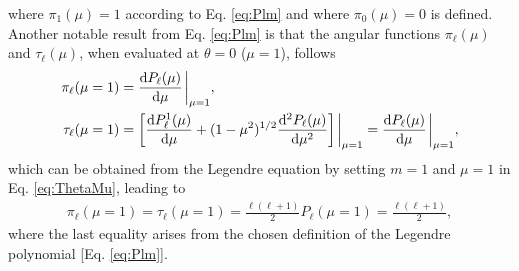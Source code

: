 %
where $\pi_1(\mu) = 1$ according to  Eq. \eqref{eq:Plm} and where $\pi_0(\mu)=0$ is defined. Another notable result from Eq. \eqref{eq:Plm} is that the angular functions $\pi_\ell(\mu)$ and $\tau_\ell(\mu)$, when evaluated at $\theta =0$ ($\mu = 1$),  follows
%
\begin{align}
\pi_\ell(\mu=1) & =  \dv{P_\ell(\mu)}{\mu}\eval_{\mu=1},\\
\tau_\ell (\mu = 1) & = \qty[\dv{P_\ell^1(\mu)}{\mu} + (1-\mu^2)^{1/2}\dv[2]{P_\ell(\mu)}{\mu}]\eval_{\mu=1} = \dv{P_\ell(\mu)}{\mu}\eval_{\mu=1},
\end{align}
%
which can be obtained from the Legendre equation  by setting $m = 1$ and $\mu = 1$ in Eq. \eqref{eq:ThetaMu}, leading to
%
\begin{align}
    \pi_\ell(\mu=1) = \tau_\ell(\mu=1) = \frac{\ell(\ell+1)}{2} P_\ell(\mu = 1) = \frac{\ell(\ell+1)}{2},
    \label{eq:PiTau1}
\end{align}
%
where the last equality arises from the chosen definition of the Legendre polynomial [Eq. \eqref{eq:Plm}].

